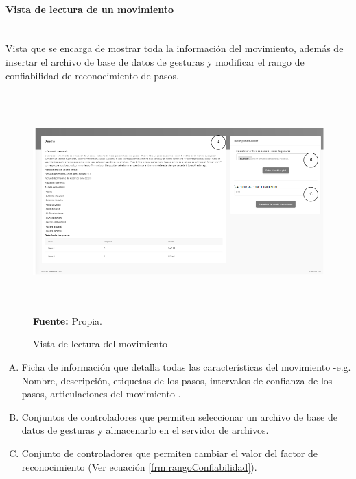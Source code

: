 \paragraph{Vista de lectura de un movimiento}\mbox{} \\ \label{ins:UI:web:read}
Vista que se encarga de mostrar toda la informaci\'on del movimiento, adem\'as de insertar el archivo de base de datos de gesturas y modificar el rango de confiabilidad de reconocimiento de pasos.
\begin{figure}[H]
	\caption{Vista de lectura del movimiento}
	\label{fig:viewRead}
	\centering
	\includegraphics[width=460px,height=320px]{graphics/web-read.PNG} \\
	\textbf{Fuente:} Propia.
\end{figure}
\begin{enumerate}[A.]
\item Ficha de informaci\'on que detalla todas las caracter\'isticas del movimiento -e.g. Nombre, descripci\'on, etiquetas de los pasos, intervalos de confianza de los pasos, articulaciones del movimiento-.
\item Conjuntos de controladores que permiten seleccionar un archivo de base de datos de gesturas y almacenarlo en el servidor de archivos.
\item Conjunto de controladores que permiten cambiar el valor del factor de reconocimiento (Ver ecuaci\'on \ref{frm:rangoConfiabilidad}).
\end{enumerate}
